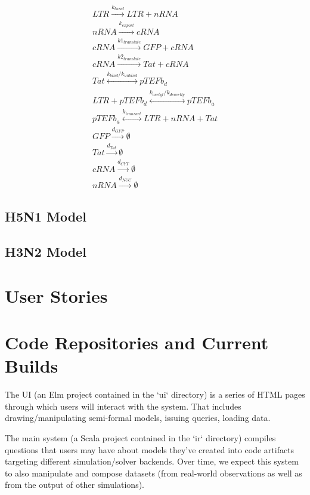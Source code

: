 \documentclass[11pt]{article}
\begin{document}
\begin{eqnarray}
LTR \overset{k_{basal}}{\rightarrow} LTR + nRNA\\
nRNA \overset{k_{export}}{\rightarrow} cRNA\\
  cRNA \overset{k1_{translate}}{\rightarrow} GFP + cRNA\\
  cRNA \overset{k2_{translate}}{\rightarrow} Tat + cRNA\\
  Tat \overset{k_{bind}/k_{unbind}}{\leftrightarrow} pTEFb_d\\
  LTR + pTEFb_d \overset{k_{acetyl}/k_{deacetly}}{\leftrightarrow} pTEFb_a\\
  pTEFb_a \overset{k_{transact}}{\leftrightarrow} LTR + nRNA + Tat\\
  GFP \overset{d_{GFP}}{\rightarrow} \emptyset\\
  Tat \overset{d_{Tat}}{\rightarrow} \emptyset\\
  cRNA \overset{d_{CYT}}{\rightarrow} \emptyset\\
  nRNA \overset{d_{NUC}}{\rightarrow} \emptyset
\end{eqnarray}

\subsection{H5N1 Model}

\subsection{H3N2 Model}

\section{User Stories}

\section{Code Repositories and Current Builds}

The UI (an Elm project contained in the `ui` directory) is a series of
HTML pages through which users will interact with the system. That includes
drawing/manipulating semi-formal models, issuing queries, loading data.

The main system (a Scala project contained in the `ir` directory) compiles
questions that users may have about models they've created into code artifacts
targeting different simulation/solver backends. Over time, we expect this
system to also manipulate and compose datasets (from real-world observations
as well as from the output of other simulations).
\end{document}
